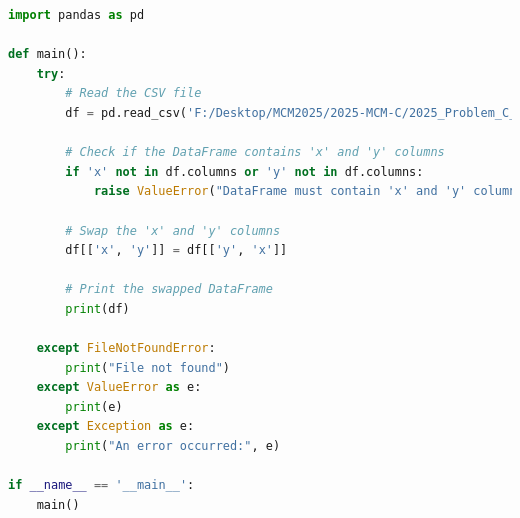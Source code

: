 \documentclass[12pt]{article}
\begin{document}
\begin{lstlisting}[language=Python, style=mystyle, caption=data\_process\_program\_plot1.py]
import pandas as pd

def main():
    try:
        # Read the CSV file
        df = pd.read_csv('F:/Desktop/MCM2025/2025-MCM-C/2025_Problem_C_Data/program_plot_end.csv')

        # Check if the DataFrame contains 'x' and 'y' columns
        if 'x' not in df.columns or 'y' not in df.columns:
            raise ValueError("DataFrame must contain 'x' and 'y' columns")

        # Swap the 'x' and 'y' columns
        df[['x', 'y']] = df[['y', 'x']]

        # Print the swapped DataFrame
        print(df)

    except FileNotFoundError:
        print("File not found")
    except ValueError as e:
        print(e)
    except Exception as e:
        print("An error occurred:", e)

if __name__ == '__main__':
    main()
\end{lstlisting}
\end{document}
